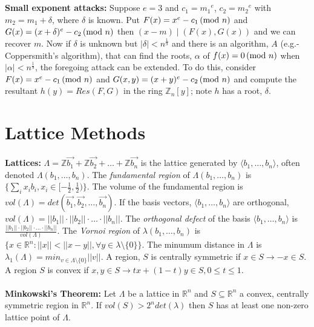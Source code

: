 \\
\\
{\bf Small exponent attacks:}  Suppose $e=3$ and 
$c_1= {m_1}^{e}$, $c_2= {m_2}^{e}$ with $m_2= m_1 + \delta$, where $\delta$ is known.
Put $F(x)= x^e-c_1 \thinspace \textnormal{(mod } n \textnormal{)}$ and
$G(x)= (x+\delta)^e-c_2 \thinspace \textnormal{(mod } n \textnormal{)}$ then $(x-m) \mid (F(x), G(x))$ and we can recover $m$.
Now if $\delta$ is unknown but $| \delta | < n^{\frac 1 9}$ and there is an algorithm, $A$
(e.g.- Coppersmith's algorithm),
that can find the roots, $\alpha$ of $f(x)=0 \thinspace \textnormal{(mod } n \textnormal{)}$ when $| \alpha|< n^{\frac 1 9}$, the
foregoing attack can be extended.  To do this, consider $F(x)= x^e - c_1 \thinspace \textnormal{(mod } n \textnormal{)}$ and
$G(x,y)= (x+y)^e -c_2 \thinspace \textnormal{(mod } n \textnormal{)}$ and compute the resultant $h(y)= Res(F,G)$ in the ring
${\mathbb Z}_n[y]$; note $h$ has a root, $\delta$.
\section {Lattice Methods}
{\bf Lattices:} 
$\Lambda = {\mathbb Z} {\vec {b_1}} + {\mathbb Z} {\vec {b_2}} + \ldots + {\mathbb Z} {\vec {b_n}}$
is the lattice generated by $\langle b_1 , \ldots , b_n \rangle$, often denoted
$\Lambda(b_1 , \ldots , b_n)$.
The \emph{fundamental region}
of $\Lambda(b_1 , \ldots , b_n)$ is $\{\sum_i x_i b_i, x_i \in [-{\frac  1 2}, {\frac 1 2}) \}$.
The volume of
the fundamental region is $vol(\Lambda) = det({\vec {b_1}}, {\vec {b_2}}, \ldots, {\vec {b_n}})$.
If the basis vectors, $\langle b_1 , \ldots , b_n \rangle$ are orthogonal,
$vol(\Lambda) = ||b_1|| \cdot ||b_2|| \cdot \ldots \cdot ||b_n||$.  The \emph{orthogonal defect}
of the basis $\langle b_1 , \ldots , b_n \rangle$ is ${\frac {||b_1|| \cdot ||b_2|| \cdot \ldots \cdot ||b_n||}
{vol(\Lambda)}}$. The \emph{Vornoi region} of $\lambda(b_1 , \ldots , b_n)$ is
$\{ x \in \mathbb{R}^n : ||x|| < ||x-y||, \forall y \in \lambda \setminus \{0\} \}$.  The
minumum distance in $\Lambda$ is $\lambda_1(\Lambda) = min_{v \in \Lambda \setminus \{0\}} ||v||$.
A region, $S$ is centrally symmetric if $x \in S \rightarrow -x \in S$.  A region $S$ is convex
if $x,y \in S \rightarrow tx + (1-t)y \in S, 0 \leq t \leq 1$.
\\
\\
{\bf Minkowski's Theorem: } Let $\Lambda$ be a lattice in ${\mathbb R}^n$ and $S \subseteq {\mathbb R}^n$
a convex, centrally symmetric region in ${\mathbb R}^n$.  If $vol(S) > 2^n det(\lambda)$ then $S$ has
at least one non-zero lattice point of $\Lambda$.
